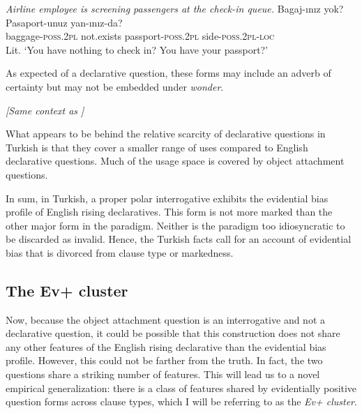 \documentclass[output=paper,colorlinks,citecolor=brown]{langscibook}
\begin{document}
\ea \label{ex:11:14} \textit{Airline employee is screening passengers at the check-in queue.}
\sn
\gll Bagaj-ınız yok? Pasaport-unuz yan-ınız-da?\\
baggage-\textsc{poss.2pl} not.exists passport-\textsc{poss.2pl} side-\textsc{poss.2pl-loc}\\
\glt Lit. `You have nothing to check in? You have your passport?'
\z

As expected of a declarative question, these forms may include an adverb of certainty but may not be embedded under \textit{wonder}. 

\ea \label{ex:11:15} \textit{[Same context as ]}
\label{ex:11:15a}
\label{ex:11:15b}
\z
\z

What appears to be behind the relative scarcity of declarative questions in Turkish is that they cover a smaller range of uses compared to English declarative questions. Much of the usage space is covered by object attachment questions.

In sum, in Turkish, a proper polar interrogative exhibits the evidential bias profile of English rising declaratives. This form is not more marked than the other major form in the paradigm. Neither is the paradigm too idiosyncratic to be discarded as invalid. Hence, the Turkish facts call for an account of evidential bias that is divorced from clause type or markedness. 

\subsection{The Ev+ cluster}\label{sec:11:2:3}

Now, because the object attachment question is an interrogative and not a declarative question, it could be possible that this construction does not share any other features of the English rising declarative than the evidential bias profile. However, this could not be farther from the truth. In fact, the two questions share a striking number of features. This will lead us to a novel empirical generalization: there is a class of features shared by evidentially positive question forms across clause types, which I will be referring to as the \textit{Ev+ cluster}. 
\end{document}
